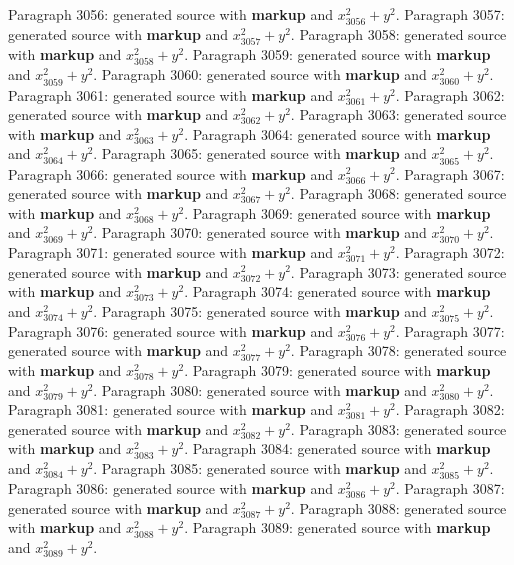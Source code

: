 \documentclass{article}
\begin{document}
Paragraph 3056: generated source with \textbf{markup} and $x_{3056}^2 + y^2$.
Paragraph 3057: generated source with \textbf{markup} and $x_{3057}^2 + y^2$.
Paragraph 3058: generated source with \textbf{markup} and $x_{3058}^2 + y^2$.
Paragraph 3059: generated source with \textbf{markup} and $x_{3059}^2 + y^2$.
Paragraph 3060: generated source with \textbf{markup} and $x_{3060}^2 + y^2$.
Paragraph 3061: generated source with \textbf{markup} and $x_{3061}^2 + y^2$.
Paragraph 3062: generated source with \textbf{markup} and $x_{3062}^2 + y^2$.
Paragraph 3063: generated source with \textbf{markup} and $x_{3063}^2 + y^2$.
Paragraph 3064: generated source with \textbf{markup} and $x_{3064}^2 + y^2$.
Paragraph 3065: generated source with \textbf{markup} and $x_{3065}^2 + y^2$.
Paragraph 3066: generated source with \textbf{markup} and $x_{3066}^2 + y^2$.
Paragraph 3067: generated source with \textbf{markup} and $x_{3067}^2 + y^2$.
Paragraph 3068: generated source with \textbf{markup} and $x_{3068}^2 + y^2$.
Paragraph 3069: generated source with \textbf{markup} and $x_{3069}^2 + y^2$.
Paragraph 3070: generated source with \textbf{markup} and $x_{3070}^2 + y^2$.
Paragraph 3071: generated source with \textbf{markup} and $x_{3071}^2 + y^2$.
Paragraph 3072: generated source with \textbf{markup} and $x_{3072}^2 + y^2$.
Paragraph 3073: generated source with \textbf{markup} and $x_{3073}^2 + y^2$.
Paragraph 3074: generated source with \textbf{markup} and $x_{3074}^2 + y^2$.
Paragraph 3075: generated source with \textbf{markup} and $x_{3075}^2 + y^2$.
Paragraph 3076: generated source with \textbf{markup} and $x_{3076}^2 + y^2$.
Paragraph 3077: generated source with \textbf{markup} and $x_{3077}^2 + y^2$.
Paragraph 3078: generated source with \textbf{markup} and $x_{3078}^2 + y^2$.
Paragraph 3079: generated source with \textbf{markup} and $x_{3079}^2 + y^2$.
Paragraph 3080: generated source with \textbf{markup} and $x_{3080}^2 + y^2$.
Paragraph 3081: generated source with \textbf{markup} and $x_{3081}^2 + y^2$.
Paragraph 3082: generated source with \textbf{markup} and $x_{3082}^2 + y^2$.
Paragraph 3083: generated source with \textbf{markup} and $x_{3083}^2 + y^2$.
Paragraph 3084: generated source with \textbf{markup} and $x_{3084}^2 + y^2$.
Paragraph 3085: generated source with \textbf{markup} and $x_{3085}^2 + y^2$.
Paragraph 3086: generated source with \textbf{markup} and $x_{3086}^2 + y^2$.
Paragraph 3087: generated source with \textbf{markup} and $x_{3087}^2 + y^2$.
Paragraph 3088: generated source with \textbf{markup} and $x_{3088}^2 + y^2$.
Paragraph 3089: generated source with \textbf{markup} and $x_{3089}^2 + y^2$.
\end{document}
